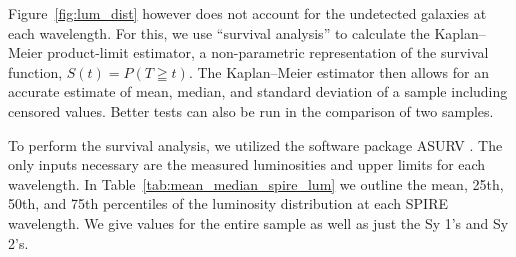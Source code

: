 Figure~\ref{fig:lum_dist} however does not account for the undetected galaxies at each wavelength. For this, we use ``survival analysis'' to calculate the Kaplan--Meier product-limit estimator, a non-parametric representation of the survival function, $S(t) = P(T \geqq t)$. The Kaplan--Meier estimator then allows for an accurate estimate of mean, median, and standard deviation of a sample including censored values. Better tests can also be run in the comparison of two samples. 

To perform the survival analysis, we utilized the software package ASURV \citep{Feigelson:1985lr, Isobe:1990fk}. The only inputs necessary are the measured luminosities and upper limits for each wavelength. In Table~\ref{tab:mean_median_spire_lum} we outline the mean, 25th, 50th, and 75th percentiles of the luminosity distribution at each SPIRE wavelength. We give values for the entire sample as well as just the Sy 1's and Sy 2's.
